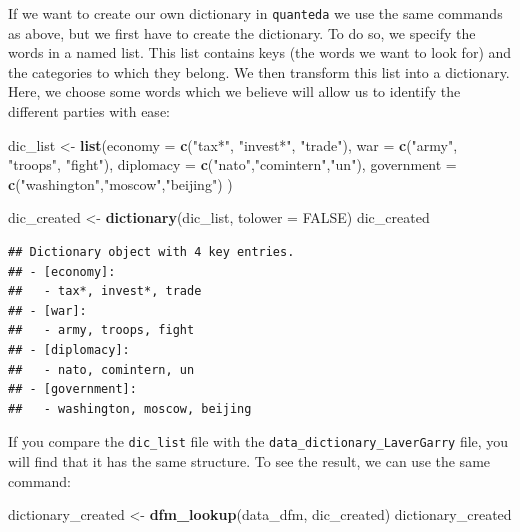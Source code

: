 \documentclass[
]{book}
\newenvironment{Shaded}{\begin{snugshade}}{\end{snugshade}}
\newcommand{\AttributeTok}[1]{\textcolor[rgb]{0.13,0.29,0.53}{#1}}
\newcommand{\ConstantTok}[1]{\textcolor[rgb]{0.56,0.35,0.01}{#1}}
\newcommand{\FunctionTok}[1]{\textcolor[rgb]{0.13,0.29,0.53}{\textbf{#1}}}
\newcommand{\NormalTok}[1]{#1}
\newcommand{\OtherTok}[1]{\textcolor[rgb]{0.56,0.35,0.01}{#1}}
\newcommand{\StringTok}[1]{\textcolor[rgb]{0.31,0.60,0.02}{#1}}
\begin{document}
If we want to create our own dictionary in \texttt{quanteda} we use the same commands as above, but we first have to create the dictionary. To do so, we specify the words in a named list. This list contains keys (the words we want to look for) and the categories to which they belong. We then transform this list into a dictionary. Here, we choose some words which we believe will allow us to identify the different parties with ease:

\begin{Shaded}
\begin{Highlighting}[]
\NormalTok{dic\_list }\OtherTok{\textless{}{-}} \FunctionTok{list}\NormalTok{(}\AttributeTok{economy =} \FunctionTok{c}\NormalTok{(}\StringTok{"tax*"}\NormalTok{, }\StringTok{"invest*"}\NormalTok{, }\StringTok{"trade"}\NormalTok{), }
                 \AttributeTok{war =} \FunctionTok{c}\NormalTok{(}\StringTok{"army"}\NormalTok{, }\StringTok{"troops"}\NormalTok{, }\StringTok{"fight"}\NormalTok{), }
                 \AttributeTok{diplomacy =} \FunctionTok{c}\NormalTok{(}\StringTok{"nato"}\NormalTok{,}\StringTok{"comintern"}\NormalTok{,}\StringTok{"un"}\NormalTok{), }
                 \AttributeTok{government =} \FunctionTok{c}\NormalTok{(}\StringTok{"washington"}\NormalTok{,}\StringTok{"moscow"}\NormalTok{,}\StringTok{"beijing"}\NormalTok{)}
\NormalTok{                 )}

\NormalTok{dic\_created }\OtherTok{\textless{}{-}} \FunctionTok{dictionary}\NormalTok{(dic\_list, }\AttributeTok{tolower =} \ConstantTok{FALSE}\NormalTok{)}
\NormalTok{dic\_created}
\end{Highlighting}
\end{Shaded}

\begin{verbatim}
## Dictionary object with 4 key entries.
## - [economy]:
##   - tax*, invest*, trade
## - [war]:
##   - army, troops, fight
## - [diplomacy]:
##   - nato, comintern, un
## - [government]:
##   - washington, moscow, beijing
\end{verbatim}

If you compare the \texttt{dic\_list} file with the \texttt{data\_dictionary\_LaverGarry} file, you will find that it has the same structure. To see the result, we can use the same command:

\begin{Shaded}
\begin{Highlighting}[]
\NormalTok{dictionary\_created }\OtherTok{\textless{}{-}} \FunctionTok{dfm\_lookup}\NormalTok{(data\_dfm, dic\_created)}
\NormalTok{dictionary\_created}
\end{Highlighting}
\end{Shaded}
\end{document}
